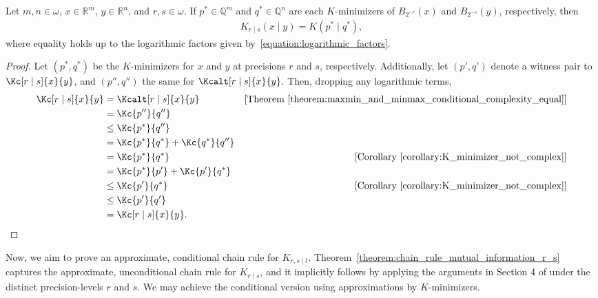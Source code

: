 \begin{proposition}
    \label{lemma:conditional_K_minimizers_suffice}
    Let $m, n \in \omega$, $x \in \mathbb{R}^m$, $y \in \mathbb{R}^n$, and $r, s \in \omega$. If $p^* \in \mathbb{Q}^m$ and $q^* \in \mathbb{Q}^n$ are each $K$-minimizers of $B_{2^{-r}}(x)$ and $B_{2^{-s}}(y)$, respectively, then
    \begin{align*}
        K_{r \mid s}(x \mid y) = K(p^* \mid q^*),
    \end{align*}
    where equality holds up to the logarithmic factors given by~\eqref{equation:logarithmic_factors}.
\end{proposition}
\begin{proof}
    Let $(p^*, q^*)$ be the $K$-minimizers for $x$ and $y$ at precisions $r$ and $s$, respectively. Additionally, let $(p', q')$ denote a witness pair to $\Kc[r \mid s]{x}{y}$, and $(p'', q'')$ the same for $\Kcalt[r \mid s]{x}{y}$. Then, dropping any logarithmic terms,
    \begin{align*}
        \Kc[r \mid s]{x}{y} &= \Kcalt[r \mid s]{x}{y} & [\text{Theorem~\ref{theorem:maxmin_and_minmax_conditional_complexity_equal}}]\\
        &= \Kc{p''}{q''}\\
        &\leq \Kc{p^*}{q''}\\
        &= \Kc{p^*}{q^*} + \Kc{q^*}{q''}\\
        &= \Kc{p^*}{q^*} & [\text{Corollary~\ref{corollary:K_minimizer_not_complex}}]\\
        &= \Kc{p^*}{p'} + \Kc{p'}{q^*}\\
        &\leq \Kc{p'}{q^*} & [\text{Corollary~\ref{corollary:K_minimizer_not_complex}}]\\
        &\leq \Kc{p'}{q'}\\
        &= \Kc[r \mid s]{x}{y}.
    \end{align*}
\end{proof}

Now, we aim to prove an approximate, conditional chain rule for $K_{r, s \mid t}$. Theorem~\ref{theorem:chain_rule_mutual_information_r_s} captures the approximate, unconditional chain rule for $K_{r \mid s}$, and it implicitly follows by applying the arguments in Section 4 of \cite{CL14} under the distinct precision-levels $r$ and $s$. We may achieve the conditional version using approximations by $K$-minimizers. 

